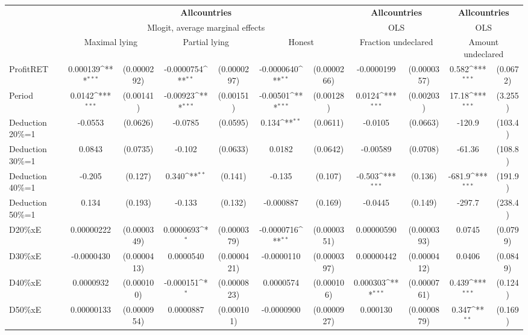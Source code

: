 \def\sym#1{\ifmmode^{#1}\else\(^{#1}\)\fi}
\begin{tabular}{l|cccccc|cc|cc}
\hline\hline
&\multicolumn{6}{c|}{\bf All\space{}countries}&\multicolumn{2}{c|}{\bf All\space{}countries}&\multicolumn{2}{c}{\bf All\space{}countries}\\ &\multicolumn{6}{c|}{Mlogit, average marginal effects }&\multicolumn{2}{c|}{OLS}&\multicolumn{2}{c}{OLS}\\
                &\multicolumn{2}{c}{Maximal lying}&\multicolumn{2}{c}{Partial lying}&\multicolumn{2}{c}{Honest}  &\multicolumn{2}{c}{Fraction undeclared}&\multicolumn{2}{c}{Amount undeclared}\\
\hline
ProfitRET       & 0.000139\sym{***}&(0.0000292)&-0.0000754\sym{**} &(0.0000297)&-0.0000640\sym{**} &(0.0000266)&-0.0000199         &(0.0000357)&    0.582\sym{***}& (0.0672)\\
Period          &   0.0142\sym{***}&(0.00141)& -0.00923\sym{***}&(0.00151)& -0.00501\sym{***}&(0.00128)&   0.0124\sym{***}&(0.00203)&    17.18\sym{***}&  (3.255)\\
Deduction 20\%=1&  -0.0553         & (0.0626)&  -0.0785         & (0.0595)&    0.134\sym{**} & (0.0611)&  -0.0105         & (0.0663)&   -120.9         &  (103.4)\\
Deduction 30\%=1&   0.0843         & (0.0735)&   -0.102         & (0.0633)&   0.0182         & (0.0642)& -0.00589         & (0.0708)&   -61.36         &  (108.8)\\
Deduction 40\%=1&   -0.205         &  (0.127)&    0.340\sym{**} &  (0.141)&   -0.135         &  (0.107)&   -0.503\sym{***}&  (0.136)&   -681.9\sym{***}&  (191.9)\\
Deduction 50\%=1&    0.134         &  (0.193)&   -0.133         &  (0.132)&-0.000887         &  (0.169)&  -0.0445         &  (0.149)&   -297.7         &  (238.4)\\
D20\%xE         &0.00000222         &(0.0000349)&0.0000693\sym{*}  &(0.0000379)&-0.0000716\sym{**} &(0.0000351)&0.00000590         &(0.0000393)&   0.0745         & (0.0799)\\
D30\%xE         &-0.0000430         &(0.0000413)&0.0000540         &(0.0000421)&-0.0000110         &(0.0000397)&0.00000442         &(0.0000412)&   0.0406         & (0.0849)\\
D40\%xE         &0.0000932         &(0.000100)&-0.000151\sym{*}  &(0.0000823)&0.0000574         &(0.000106)& 0.000303\sym{***}&(0.0000761)&    0.439\sym{***}&  (0.124)\\
D50\%xE         &0.00000133         &(0.0000954)&0.0000887         &(0.000101)&-0.0000900         &(0.0000927)& 0.000130         &(0.0000879)&    0.347\sym{**} &  (0.169)\\

\end{tabular}
